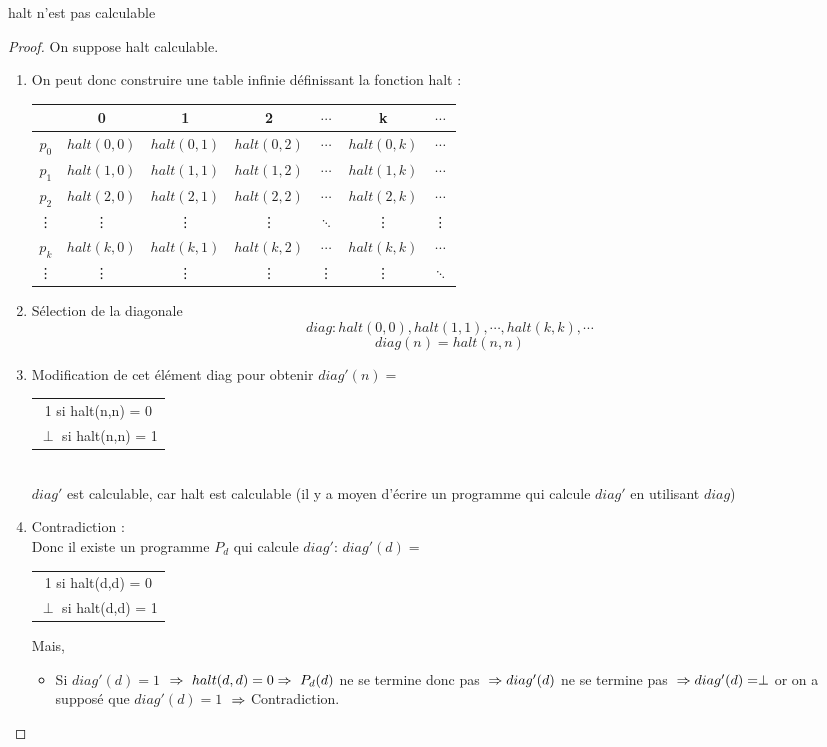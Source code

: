 \begin{mytheo}[halt]
	halt n'est pas calculable
	\begin{proof}
	On suppose halt calculable.
	\begin{enumerate}
		\item On peut donc construire une table infinie définissant la fonction
			halt : \\
			\begin{tabular}{|c||c|c|c|c|c|c|}
				\hline
				& 0 & 1 & 2 & $\cdots$ & k & $\cdots$ \\
				\hline
				$p_0$ & $halt(0,0)$ & $halt(0,1)$ & $halt(0,2)$ & $\cdots$ & $halt(0,k)$ & $\cdots$ \\
				$p_1$ & $halt(1,0)$ & $halt(1,1)$ & $halt(1,2)$ & $\cdots$ & $halt(1,k)$ & $\cdots$ \\
				$p_2$ & $halt(2,0)$ & $halt(2,1)$ & $halt(2,2)$ & $\cdots$ & $halt(2,k)$ & $\cdots$ \\
				\vdots & {\vdots} &{\vdots}& {\vdots} & $\ddots$ & {\vdots} &{\vdots}\\
				$p_k$ & $halt(k,0)$ & $halt(k,1)$ & $halt(k,2)$ & $\cdots$ & $halt(k,k)$ & $\cdots$ \\
				\vdots & {\vdots} &{\vdots}& {\vdots} & {\vdots} & {\vdots} &$\ddots$\\
				\hline
			\end{tabular}
		\item Sélection de la diagonale
			\[ diag :halt(0,0),halt(1,1),\cdots ,halt(k,k), \cdots \]
			\[diag(n) = halt(n,n)\]
		\item Modification de cet élément diag pour obtenir
			$diag'(n) =$
			\begin{tabular}{c}
				1 si halt(n,n) = 0\\
				$\perp$ si halt(n,n) = 1\\
			\end{tabular}\\
			$diag'$ est calculable, car halt est calculable (il y a moyen
			d'écrire un programme qui calcule $diag'$ en utilisant $diag$)
		\item Contradiction :\\
		       	Donc il existe un programme $P_d$ qui calcule
			$diag'$:
			$diag'(d) =$
			\begin{tabular}{c}
				1 si halt(d,d) = 0\\
				$\perp$ si halt(d,d) = 1\\
			\end{tabular}
			Mais,
			\begin{itemize}
				\item Si $diag'(d)= 1$ $\\
				\Rightarrow \  halt(d,d) = 0 \\
				\Rightarrow \ P_d(d)$ ne se termine donc pas $ \\
				\Rightarrow diag'(d)$ ne se termine pas $ \\
				\Rightarrow diag'(d) = \perp$ or on a supposé que $diag'(d) = 1$ $ \\
				\Rightarrow $
				Contradiction.


\end{itemize}
\end{enumerate}
\end{proof}
\end{mytheo}
